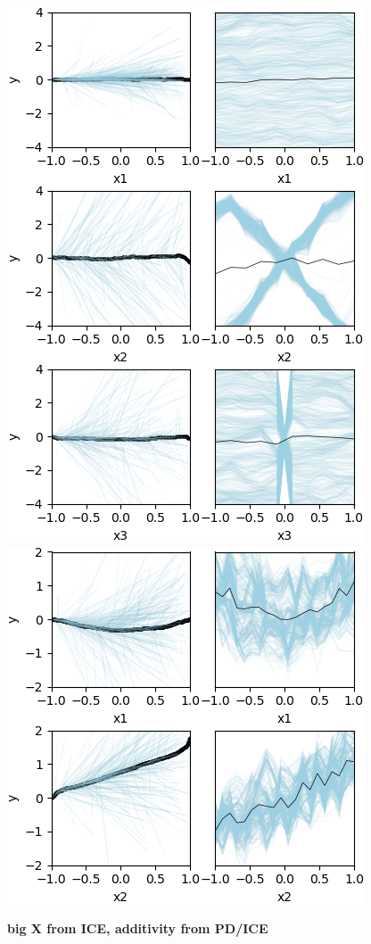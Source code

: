 \documentclass[12pt]{article}
\begin{document}
\begin{figure}[htbp]
\begin{center}
\includegraphics[scale=0.8]{images/bigx.png}
\includegraphics[scale=0.7]{images/additivity.png}
\caption{{\bf big X from ICE, additivity from PD/ICE}}
\label{fig:bigx_y_stratpd}
\end{center}
\end{figure}
\end{document}
